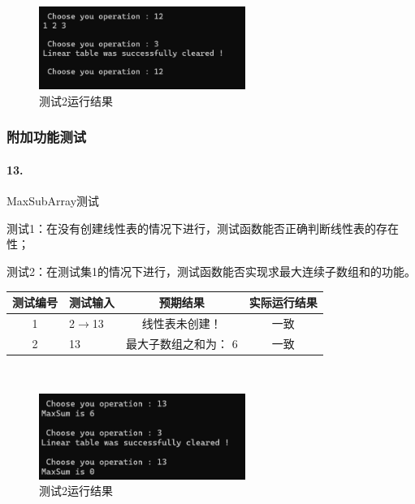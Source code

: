\documentclass[supercite]{Experimental_Report}
\theoremstyle{definition}
\begin{document}
~\

 \begin{figure}[H]
 	\centering
 	\includegraphics[width=0.6\textwidth]{images/线性表测试12.png}
 	\caption{测试2运行结果}
 	\label{txlab}
 \end{figure}


\subsubsection{附加功能测试}

\paragraph{13.}MaxSubArray测试

测试1：在没有创建线性表的情况下进行，测试函数能否正确判断线性表的存在性；
	
测试2：在测试集1的情况下进行，测试函数能否实现求最大连续子数组和的功能。

\vspace{0.5em}

\begin{tabular}{|c|p{2.7cm}|c|c|}
	\hline
	测试编号 & 测试输入 & 预期结果 & 实际运行结果 \\
	\hline
	1 & 2$\rightarrow$13 & 线性表未创建！ & 一致 \\
	\hline
	2 & 13 & 最大子数组之和为： 6& 一致 \\
	\hline
\end{tabular}

~\

 \begin{figure}[H]
 	\centering
 	\includegraphics[width=0.6\textwidth]{images/线性表测试13.png}
 	\caption{测试2运行结果}
 	\label{txlab}
 \end{figure}
\end{document}
